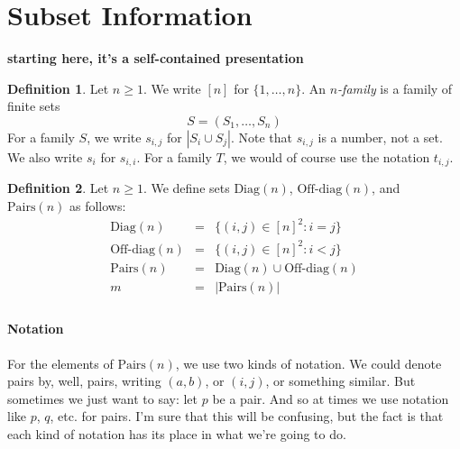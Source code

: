 \documentclass[12pt]{article}
\theoremstyle{definition}
\newtheorem{definition}{Definition}
\newcommand{\set}[1]{\{ #1 \}}
\newcommand{\Diag}{\mbox{Diag}}
\newcommand{\OffDiag}{\mbox{Off-diag}}
\newcommand{\Pairs}{\mbox{Pairs}}
\begin{document}
\vfil\eject


\section{Subset Information}

{\bf starting here, it's a self-contained presentation}

\begin{definition}
Let $n\geq 1$.   We write $[n]$ for $\set{1,\ldots, n}$.
An \emph{$n$-family} is  a family of  finite sets
\[ S = (S_1, \ldots, S_n)\]
For a family $S$, we write $s_{i,j}$
for $|S_i\cup S_j|$.  Note that $s_{i,j}$
is a number, not a set.
We also write $s_i$ for $s_{i,i}$.
For a family $T$, we would of course use the notation $t_{i,j}$.
\end{definition}

\begin{definition}
Let $n\geq 1$.
We define  sets $\Diag(n)$, $\OffDiag(n)$, and $\Pairs(n)$ as follows:
\[
\begin{array}{lcl}
\Diag(n) & = & \set{(i,j)\in [n]^2:  i = j}\\
\OffDiag(n) & = & \set{(i,j)\in [n]^2:  i < j}\\
\Pairs(n) & = & \Diag(n)\cup\OffDiag(n)\\
m  & = & |\Pairs(n)|\\
\end{array}
\]
\end{definition}

\paragraph{Notation}
For the elements of $\Pairs(n)$, we use two kinds of notation.
We could denote pairs by, well, pairs, writing $(a,b)$, or $(i,j)$, or something similar.
But sometimes we just want to say: let $p$ be a pair.  And so at times we
use notation like $p$, $q$, etc. for pairs.
I'm sure that this will be confusing, but the fact is that each
kind of notation has its place in what we're going to do.
\end{document}
